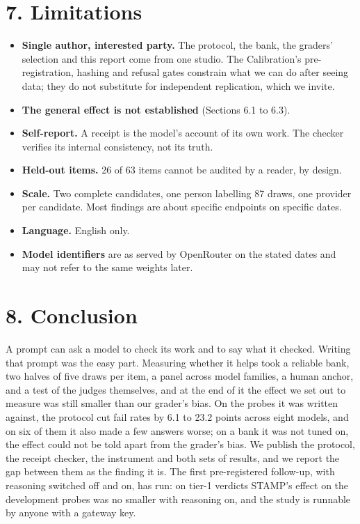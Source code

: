 \documentclass[
  11pt,
]{article}
\providecommand{\tightlist}{%
  \setlength{\itemsep}{0pt}\setlength{\parskip}{0pt}}
\begin{document}
\hypertarget{limitations}{%
\section{7. Limitations}\label{limitations}}

\begin{itemize}
\tightlist
\item
  \textbf{Single author, interested party.} The protocol, the bank, the
  graders' selection and this report come from one studio. The
  Calibration's pre-registration, hashing and refusal gates constrain
  what we can do after seeing data; they do not substitute for
  independent replication, which we invite.
\item
  \textbf{The general effect is not established} (Sections 6.1 to 6.3).
\item
  \textbf{Self-report.} A receipt is the model's account of its own
  work. The checker verifies its internal consistency, not its truth.
\item
  \textbf{Held-out items.} 26 of 63 items cannot be audited by a reader,
  by design.
\item
  \textbf{Scale.} Two complete candidates, one person labelling 87
  draws, one provider per candidate. Most findings are about specific
  endpoints on specific dates.
\item
  \textbf{Language.} English only.
\item
  \textbf{Model identifiers} are as served by OpenRouter on the stated
  dates and may not refer to the same weights later.
\end{itemize}

\hypertarget{conclusion}{%
\section{8. Conclusion}\label{conclusion}}

A prompt can ask a model to check its work and to say what it checked.
Writing that prompt was the easy part. Measuring whether it helps took a
reliable bank, two halves of five draws per item, a panel across model
families, a human anchor, and a test of the judges themselves, and at
the end of it the effect we set out to measure was still smaller than
our grader's bias. On the probes it was written against, the protocol
cut fail rates by 6.1 to 23.2 points across eight models, and on six of
them it also made a few answers worse; on a bank it was not tuned on,
the effect could not be told apart from the grader's bias. We publish
the protocol, the receipt checker, the instrument and both sets of
results, and we report the gap between them as the finding it is. The
first pre-registered follow-up, with reasoning switched off and on, has
run: on tier-1 verdicts STAMP's effect on the development probes was no
smaller with reasoning on, and the study is runnable by anyone with a
gateway key.
\end{document}
